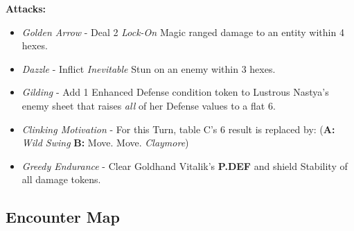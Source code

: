 \textbf{Attacks:}
\begin{itemize}
\item \emph{Golden Arrow} -  Deal 2 \emph{Lock-On} Magic ranged damage to an entity within 4 hexes.
\item \emph{Dazzle} - Inflict \emph{Inevitable} Stun on an enemy within 3 hexes.
\item \emph{Gilding} - Add 1 Enhanced Defense condition token to Lustrous Nastya’s enemy sheet that raises \emph{all} of her Defense values to a flat 6.
\item \emph{Clinking Motivation} - For this Turn, table C’s 6 result is replaced by: \newline (\textbf{A:} \emph{Wild Swing} \textbf{B:} Move. Move. \emph{Claymore})
\item \emph{Greedy Endurance} - Clear Goldhand Vitalik’s \textbf{P.DEF} and shield Stability of all damage tokens. 
\end{itemize}

\pagebreak

\subsection*{Encounter Map}
\begin{center}
\end{center}

